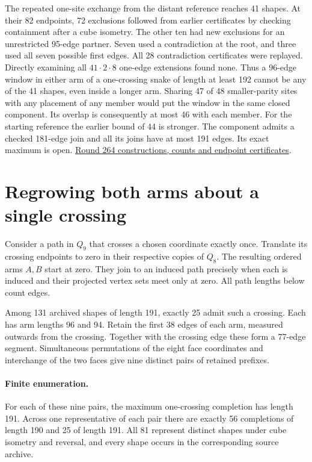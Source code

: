 \documentclass[11pt,a4paper]{article}
\theoremstyle{definition}
\theoremstyle{remark}
\begin{document}
The repeated one-site exchange from the distant reference reaches 41
shapes. At their 82 endpoints, 72 exclusions followed from earlier
certificates by checking containment after a cube isometry. The other
ten had new exclusions for an unrestricted 95-edge partner. Seven used
a contradiction at the root, and three used all seven possible first
edges. All 28 contradiction certificates were replayed. Directly
examining all \(41\cdot2\cdot8\) one-edge extensions found none. Thus
a 96-edge window in either arm of a one-crossing snake of length at least 192 cannot
be any of the 41 shapes, even inside a longer arm. Sharing 47 of 48
smaller-parity sites with any placement of any member would put the
window in the same closed component. Its overlap is consequently at
most 46 with each member. For the starting reference the earlier
bound of 44 is stronger. The component admits a checked 181-edge join
and all its joins have at most 191 edges. Its exact maximum is open.
\href{https://github.com/hironaka-iori/Snake-in-the-box-in-9/tree/main/milestones/264-distant-component}{Round 264 constructions, counts and endpoint certificates}.

\section{Regrowing both arms about a single crossing}
Consider a path in $Q_9$ that crosses a chosen coordinate exactly once.
Translate its crossing endpoints to zero in their respective copies of $Q_8$.
The resulting ordered arms $A,B$ start at zero. They join to an induced
path precisely when each is induced and their projected vertex sets meet
only at zero. All path lengths below count edges.

Among 131 archived shapes of length 191, exactly 25 admit such a crossing.
Each has arm lengths 96 and 94. Retain the first 38 edges of each arm,
measured outwards from the crossing. Together with the crossing edge
these form a 77-edge segment. Simultaneous permutations of the eight
face coordinates and interchange of the two faces give nine distinct
pairs of retained prefixes.

\paragraph{Finite enumeration.}
For each of these nine pairs, the maximum one-crossing completion has
length 191. Across one representative of each pair there are exactly
56 completions of length 190 and 25 of length 191. All 81 represent
distinct shapes under cube isometry and reversal, and every shape occurs
in the corresponding source archive.
\end{document}
